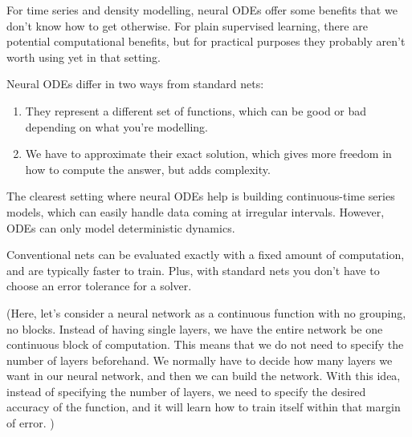 \documentclass[10pt,a4paper]{article}
\theoremstyle{definition}
\theoremstyle{theorem}
\begin{document}

For time series and density modelling, neural ODEs offer some benefits that we don't know how to get otherwise. For plain supervised learning, there are potential computational benefits, but for practical purposes they probably aren't worth using yet in that setting.

Neural ODEs differ in two ways from standard nets:

\begin{enumerate}
\item They represent a different set of functions, which can be good or bad depending on what you're modelling.
\item We have to approximate their exact solution, which gives more freedom in how to compute the answer, but adds complexity.
\end{enumerate}

The clearest setting where neural ODEs help is building continuous-time series models, which can easily handle data coming at irregular intervals. However, ODEs can only model deterministic dynamics. 

Conventional nets can be evaluated exactly with a fixed amount of computation, and are typically faster to train. Plus, with standard nets you don't have to choose an error tolerance for a solver.











(Here, let's consider a neural network as a continuous function with no grouping, no blocks. Instead of having single layers, we have the entire network be one continuous block of computation. This means that we do not need to specify the number of layers beforehand. We normally have to decide how many layers we want in our neural network, and then we can build the network. With this idea, instead of specifying the number of layers, we need to specify the desired accuracy of the function, and it will learn how to train itself within that margin of error. )
\end{document}
